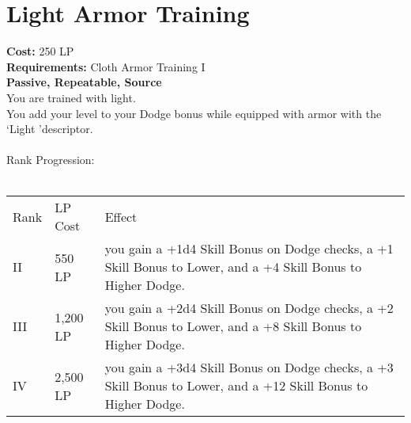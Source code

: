 \section{Light Armor Training}\label{perk:lightArmorTraining}
\textbf{Cost:} 250 LP\\
\textbf{Requirements:} Cloth Armor Training I\\
\textbf{Passive, Repeatable, Source}\\
You are trained with light.\\
You add your level to your Dodge bonus while equipped with armor with the \lq Light \rq descriptor.\\
\\

Rank Progression:\\
\\
\begin{longtable}{l | l | p{9cm}}
	Rank & LP Cost & Effect\\
	II & 550 LP & you gain a +1d4 Skill Bonus on Dodge checks, a +1 Skill Bonus to Lower, and a +4 Skill Bonus to Higher Dodge.\\
	III & 1,200 LP & you gain a +2d4 Skill Bonus on Dodge checks, a +2 Skill Bonus to Lower, and a +8 Skill Bonus to Higher Dodge.\\
	IV & 2,500 LP & you gain a +3d4 Skill Bonus on Dodge checks, a +3 Skill Bonus to Lower, and a +12 Skill Bonus to Higher Dodge.\\
\end{longtable}

